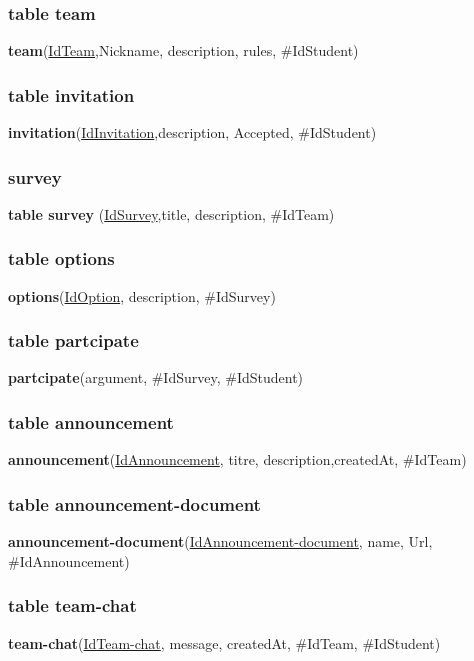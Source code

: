 \documentclass[11pt,fleqn]{book} %
\begin{document}
\subsubsection{table team}
\hspace{3em}\textbf{team}(\underline{IdTeam},Nickname, description, rules, \#IdStudent)
\subsubsection{table invitation}
\hspace{3em}\textbf{invitation}(\underline{IdInvitation},description, Accepted, \#IdStudent)
\subsubsection{survey}
\hspace{3em}\textbf{table survey} (\underline{IdSurvey},title, description, \#IdTeam)
\subsubsection{table options}
\hspace{3em}\textbf{options}(\underline{IdOption}, description, \#IdSurvey)
\subsubsection{table partcipate}
\hspace{3em}\textbf{partcipate}(argument, \#IdSurvey, \#IdStudent)
\subsubsection{table announcement}
\hspace{3em}\textbf{announcement}(\underline{IdAnnouncement}, titre, description,createdAt, \#IdTeam)
\subsubsection{table announcement-document}
\hspace{3em}\textbf{announcement-document}(\underline{IdAnnouncement-document}, name, Url, \#IdAnnouncement)

\subsubsection{table team-chat}
\hspace{3em}\textbf{team-chat}(\underline{IdTeam-chat}, message, createdAt, \#IdTeam, \#IdStudent)
\end{document}
